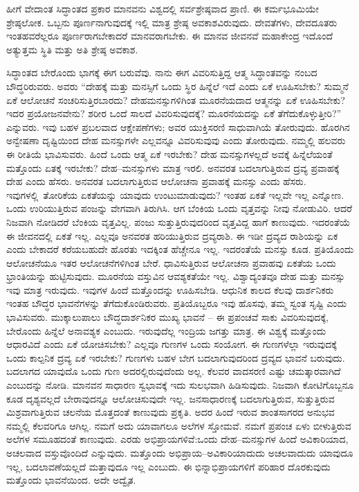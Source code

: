 \vskip 0.2cm

ಹೀಗೆ ವೇದಾಂತ ಸಿದ್ಧಾಂತದ ಪ್ರಕಾರ ಮಾನವನು ವಿಶ್ವದಲ್ಲಿ ಸರ್ವಶ್ರೇಷ್ಠವಾದ ಪ್ರಾಣಿ. ಈ ಕರ್ಮಭೂಮಿಯೇ ಶ್ರೇಷ್ಠಲೋಕ. ಒಬ್ಬನು ಪೂರ್ಣನಾಗುವುದಕ್ಕೆ ಇಲ್ಲಿ ಮಾತ್ರ ಶ್ರೇಷ್ಠ ಅವಕಾಶವಿರುವುದು. ದೇವತೆಗಳು, ದೇವದೂತರು ಇಂತಹವರೆಲ್ಲರೂ ಪೂರ್ಣರಾಗಬೇಕಾದರೆ ಮಾನವರಾಗಬೇಕು. ಈ ಮಾನವ ಜೀವನವೆ ಮಹಾಕೇಂದ್ರ ಇದೊಂದೆ ಅತ್ಯುತ್ತಮ ಸ್ಥಿತಿ ಮತ್ತು ಅತಿ ಶ್ರೇಷ್ಠ ಅವಕಾಶ.

\vskip 0.2cm

ಸಿದ್ಧಾಂತದ ಬೇರೊಂದು ಭಾಗಕ್ಕೆ ಈಗ ಬರುವೆವು. ನಾನು ಈಗ ವಿವರಿಸುತ್ತಿದ್ದ ಆತ್ಮ ಸಿದ್ಧಾಂತವನ್ನು ನಂಬದ ಬೌದ್ಧರಿರುವರು. ಅವರು “ದೇಹಕ್ಕೆ ಮತ್ತು ಮನಸ್ಸಿಗೆ ಒಂದು ಸ್ಥಿರ ಹಿನ್ನೆಲೆ ಇದೆ ಎಂದು ಏಕೆ ಊಹಿಸಬೇಕು? ಸುಮ್ಮನೆ ಏಕೆ ಆಲೋಚನೆ ಸಂಚರಿಸುತ್ತಿರಬಾರದು? ದೇಹಮನಸ್ಸುಗಳಿಗಿಂತ ಮೂರನೆಯದಾದ ಆತ್ಮನನ್ನು ಏಕೆ ಊಹಿಸಬೇಕು? ಇದರ ಪ್ರಯೋಜನವೇನು? ಶರೀರ ಒಂದೆ ಸಾಲದೆ ವಿವರಿಸುವುದಕ್ಕೆ? ಮೂರನೆಯದನ್ನು ಏಕೆ ತೆಗೆದುಕೊಳ್ಳುತ್ತೀರಿ?” ಎನ್ನುವರು. ಇವು ಬಹಳ ಪ್ರಬಲವಾದ ಆಕ್ಷೇಪಣೆಗಳು; ಅವರ ಯುಕ್ತಿಸರಣಿ ಸಾಧುವಾಗಿಯೆ ತೋರುವುದು. ಹೊರಗಿನ ಅನ್ವೇಷಣಾ ದೃಷ್ಟಿಯಿಂದ ದೇಹ ಮನಸ್ಸುಗಳೇ ಎಲ್ಲವನ್ನೂ ವಿವರಿಸುವುವು ಎಂದು ತೋರುವುದು. ನಮ್ಮಲ್ಲಿ ಹಲವರು ಈ ರೀತಿಯೆ ಭಾವಿಸುವರು. ಹಿಂದೆ ಒಂದು ಆತ್ಮ ಏಕೆ ಇರಬೇಕು? ದೇಹ ಮನಸ್ಸುಗಳಲ್ಲದೆ ಅವಕ್ಕೆ ಹಿನ್ನೆಲೆಯಂತೆ ಮತ್ತೊಂದು ಏತಕ್ಕೆ ಇರಬೇಕು? ದೇಹ–ಮನಸ್ಸುಗಳು ಮಾತ್ರ ಇರಲಿ. ಅನವರತ ಬದಲಾಗುತ್ತಿರುವ ದ್ರವ್ಯ ಪ್ರವಾಹಕ್ಕೆ ದೇಹ ಎಂದು ಹೆಸರು. ಅನವರತ ಬದಲಾಗುತ್ತಿರುವ ಆಲೋಚನಾ ಪ್ರವಾಹಕ್ಕೆ ಮನಸ್ಸು ಎಂದು ಹೆಸರು. ಇವುಗಳಲ್ಲಿ\break\ ತೋರಿಕೆಯ ಏಕತೆಯನ್ನು ಯಾವುದು ಉಂಟುಮಾಡುವುದು? ಇಂತಹ ಏಕತೆ ಇಲ್ಲವೇ ಇಲ್ಲ ಎನ್ನೋಣ. ಒಂದು ಉರಿಯುತ್ತಿರುವ ಪಂಜನ್ನು ವೇಗವಾಗಿ ತಿರುಗಿಸಿ. ಆಗ ಬೆಂಕಿಯ ಒಂದು ವೃತ್ತವನ್ನು ನೀವು ನೋಡುವಿರಿ. ಆದರೆ ನಿಜವಾಗಿ ನೋಡಿದರೆ ಬೆಂಕಿಯ ವೃತ್ತವಿಲ್ಲ. ಪಂಜು ಸುತ್ತುತ್ತಿರುವುದರಿಂದ ವೃತ್ತವಿದ್ದ ಹಾಗೆ ಕಾಣುವುದು. ಇದರಂತೆಯೆ ಈ ಜೀವನದಲ್ಲಿ ಏಕತೆ ಇಲ್ಲ. ಎಲ್ಲವೂ ಅನವರತ ಹರಿಯುತ್ತಿರುವ ದ್ರವ್ಯರಾಶಿ. ಈ ಇಡೀ ದ್ರವ್ಯದ ರಾಶಿಯನ್ನು ಏಕ ಎಂದು ಬೇಕಾದರೆ ಕರೆಯಬಹುದೇ ಹೊರತು ಇದಕ್ಕಿಂತ ಹೆಚ್ಚೇನೂ ಇಲ್ಲ. ಇದರಂತೆಯೆ ಮನಸ್ಸು ಕೂಡ. ಪ್ರತಿಯೊಂದು ಆಲೋಚನೆಯೂ ಇತರ ಆಲೋಚನೆಗಳಿಗಿಂತ ಬೇರೆ. ಧಾವಿಸುತ್ತಿರುವ ಆಲೋಚನಾ ಪ್ರವಾಹವು ಏಕತೆಯ ಒಂದು ಭ್ರಾಂತಿಯನ್ನು ಹುಟ್ಟಿಸುವುದು. ಮೂರನೆಯ ವಸ್ತುವಿನ ಆವಶ್ಯಕತೆಯೇ ಇಲ್ಲ. ವಿಶ್ವಾದ್ಯಂತವೂ ದೇಹ ಮತ್ತು ಮನಸ್ಸು ಇವು ಮಾತ್ರ ಇರುವುದು. ಇವುಗಳ ಹಿಂದೆ ಮತ್ತೊಂದನ್ನು ಊಹಿಸಬೇಡಿ. ಆಧುನಿಕ ಕಾಲದ ಕೆಲವು ದಾರ್ಶನಿಕರು ಇಂತಹ ಬೌದ್ಧರ ಭಾವನೆಗಳನ್ನು ತೆಗೆದುಕೊಂಡಿರುವರು. ಪ್ರತಿಯೊಬ್ಬರೂ ಇವು ಹೊಸವು, ತಮ್ಮ ಸ್ವಂತ ಸೃಷ್ಟಿ ಎಂದು ಭಾವಿಸುವರು. ಮುಕ್ಕಾಲುಪಾಲು ಬೌದ್ಧದಾರ್ಶನಿಕರ ಮುಖ್ಯ ಭಾವನೆ – ಈ ಪ್ರಪಂಚವೆ ಸಾಕು ವಿವರಿಸುವುದಕ್ಕೆ, ಬೇರೊಂದು ಹಿನ್ನೆಲೆ ಅನಾವಶ್ಯಕ ಎಂಬುದು. ಇರುವುದೆಲ್ಲ ಇಂದ್ರಿಯ ಜಗತ್ತು ಮಾತ್ರ. ಈ ವಿಶ್ವಕ್ಕೆ ಮತ್ತೊಂದು ಆಧಾರವಿದೆ ಎಂದು ಏಕೆ ಯೋಚಿಸಬೇಕು? ಎಲ್ಲವೂ ಗುಣಗಳ ಒಂದು ಸಂಯೋಗ. ಈ ಗುಣಗಳೆಲ್ಲಾ ಇರುವುದಕ್ಕೆ ಒಂದು ಕಾಲ್ಪನಿಕ ದ್ರವ್ಯ ಏಕೆ ಇರಬೇಕು? ಗುಣಗಳು ಬಹಳ ಬೇಗ ಬದಲಾಗುವುದರಿಂದ ದ್ರವ್ಯದ ಭಾವನೆ ಬರುವುದು. ಬದಲಾಗದ ಯಾವುದೊ ಒಂದು ಗುಣ ಅದರಲ್ಲಿರುವುದೆಂದು ಅಲ್ಲ. ಕೆಲವರ ವಾದಸರಣಿ ಎಷ್ಟು ಚಮತ್ಕಾರವಾಗಿದೆ ಎಂಬುದನ್ನು ನೋಡಿ. ಮಾನವನ ಸಾಧಾರಣ ಸ್ವಭಾವಕ್ಕೆ ಇದು ಸುಲಭವಾಗಿ ಹಿಡಿಸುವುದು. ನಿಜವಾಗಿ ಕೋಟಿಗೊಬ್ಬನೂ ಕೂಡ ದೃಶ್ಯವಲ್ಲದೆ ಬೇರಾವುದನ್ನೂ ಆಲೋಚಿಸುವುದೇ ಇಲ್ಲ. ಜನಸಾಧಾರಣಕ್ಕೆ ಬದಲಾಗುತ್ತಿರುವ, ಸುತ್ತುತ್ತಿರುವ ಮಿಶ್ರವಾಗುತ್ತಿರುವ ಚಲನೆಯ ಮೊತ್ತದಂತೆ ಕಾಣುವುದು ಪ್ರಕೃತಿ. ಅದರ ಹಿಂದೆ ಇರುವ ಶಾಂತಸಾಗರದ ಅನುಭವ ನಮ್ಮಲ್ಲಿ ಕೆಲವರಿಗೂ ಆಗಿಲ್ಲ. ನಮಗೆ ಅದು ಯಾವಾಗಲೂ ಅಲೆಗಳ ಸ್ತೋಮವೆ. ನಮಗೆ ಪ್ರಪಂಚ ಏಳು ಬೀಳುತ್ತಿರುವ ಅಲೆಗಳ ಸಮೂಹದಂತೆ ಕಾಣುವುದು. ಎರಡು ಅಭಿಪ್ರಾಯಗಳಿವೆ:ಒಂದು ದೇಹ–ಮನಸ್ಸುಗಳ ಹಿಂದೆ ಅವಿಕಾರಿಯಾದ, ಅಚಲವಾದ ವಸ್ತುವೊಂದಿದೆ ಎನ್ನುವುದು. ಮತ್ತೊಂದು ಅಭಿಪ್ರಾಯ–ಅವಿಕಾರಿಯಾದುದು ಅಚಲವಾದುದು ಯಾವುದೂ ಇಲ್ಲ, ಬದಲಾವಣೆಯಲ್ಲದೆ ಮತ್ತಾವುದೂ ಇಲ್ಲ ಎಂಬುದು. ಈ ಭಿನ್ನಾಭಿಪ್ರಾಯಗಳಿಗೆ ಪರಿಹಾರ ದೊರಕುವುದು ಮತ್ತೊಂದು ಭಾವನೆಯಿಂದ. ಅದೇ ಅದ್ವೈತ.

